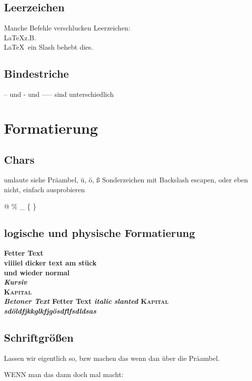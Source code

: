 

\subsection{Leerzeichen}
Manche Befehle verschlucken Leerzeichen:
\\
\LaTeX z.B. \\
\LaTeX \ ein Slash behebt dies.

\subsection{Bindestriche}

-- und - und ----- sind unterschiedlich

\section{Formatierung}

\subsection{Chars}
umlaute siehe Präambel, ü, ö, ß
Sonderzeichen mit Backslash escapen, oder eben nicht, einfach ausprobieren

@ \% \_ \{ \}

\subsection{logische und physische Formatierung}


\textbf{Fetter Text}
\\
\bfseries
viiiiel dicker text am stück
\normalfont
\\und wieder normal\\
\textit{Kursiv}
\\
\textsc{Kapital}
\\
\emph{Betoner Text}
\textbf{Fetter Text}
\textit{italic}
\textsl{slanted}
\textsc{Kapital}
\itshape
sdöldfjkkglkfjgösdflfsdldsas
\normalfont

\subsection{Schriftgrößen}
Lassen wir eigentlich so, bzw machen das wenn dan  über die Präambel.

WENN man das dann doch mal macht:

